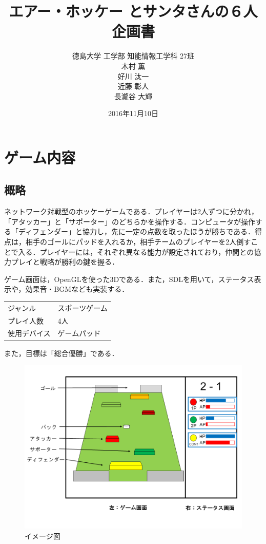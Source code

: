 \documentclass{jarticle}
\title{エアー・ホッケー とサンタさんの６人企画書}
\author{徳島大学 工学部 知能情報工学科 27班\\木村 薫\\好川 汰一\\近藤 彰人\\長瀧谷 大輝}
\date{2016年11月10日}
\begin{document}
\maketitle

\section{ゲーム内容}
\subsection{概略}
ネットワーク対戦型のホッケーゲームである．プレイヤーは2人ずつに分かれ，「アタッカー」と「サポーター」のどちらかを操作する．コンピュータが操作する「ディフェンダー」と協力し，先に一定の点数を取ったほうが勝ちである．得点は，相手のゴールにパッドを入れるか，相手チームのプレイヤーを2人倒すことで入る．プレイヤーには，それぞれ異なる能力が設定されており，仲間との協力プレイと戦略が勝利の鍵を握る．

ゲーム画面は，OpenGLを使った3Dである．また，SDLを用いて，ステータス表示や，効果音・BGMなども実装する．
\begin{table}[H]
  \begin{tabular}{ll}
    ジャンル & スポーツゲーム\\
    プレイ人数 & 4人\\
    使用デバイス & ゲームパッド\\
  \end{tabular}
\end{table}
%
また，目標は「総合優勝」である．
\begin{figure}[H]
  \begin{center}
    \includegraphics[scale=0.6]{kikaku.png}
    \caption{イメージ図}
    \label{fig:image}
  \end{center}
\end{figure}
%
\end{document}
